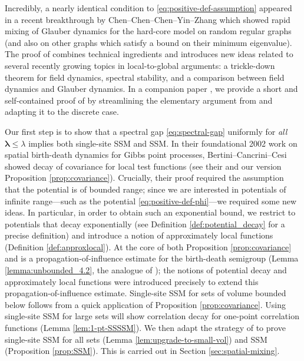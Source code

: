 \documentclass[10pt]{amsart}
\theoremstyle{definition}
\theoremstyle{remark}
\newcommand{\blambda}{{\boldsymbol{\lambda}}}
\begin{document}
	Incredibly, a nearly identical condition to \eqref{eq:positive-def-assumption} appeared in a recent breakthrough by Chen--Chen--Chen--Yin--Zhang \cite{chen2025rapid} which showed rapid mixing of Glauber dynamics for the hard-core model on random regular graphs (and also on other graphs which satisfy a bound on their minimum eigenvalue).  The proof of \cite{chen2025rapid} combines technical ingredients  and introduces new ideas related to several recently growing topics in local-to-global arguments: a trickle-down theorem for field dynamics, spectral stability, and a comparison between field dynamics and Glauber dynamics.  In a companion paper \cite{goebel2026simple}, we provide a short and self-contained proof of \cite{chen2025rapid} by streamlining the elementary argument from \cite{kondratiev2013spectral} and adapting it to the discrete case.
	
	Our first step is to show that a spectral gap \eqref{eq:spectral-gap} uniformly for \emph{all} $\blambda \leq \lambda$ implies both single-site SSM and SSM.  In their foundational 2002 work on spatial birth-death dynamics for Gibbs point processes, Bertini--Cancrini--Cesi showed decay of covariance for local test functions (see their \cite[Theorem 4.1]{bertini2002spectral} and our version Proposition \ref{prop:covariance}).  Crucially, their proof required the assumption that the potential is of bounded range; since we are interested in potentials of infinite range---such as the potential \eqref{eq:positive-def-phi}---we required some new ideas.  In particular, in order to obtain such an exponential bound, we restrict to potentials that decay exponentially (see Definition \ref{def:potential_decay} for a precise definition) and introduce a notion of approximately local functions (Definition \ref{def:approxlocal}).  At the core of both Proposition \ref{prop:covariance} and \cite[Theorem 4.1]{bertini2002spectral} is a propagation-of-influence estimate for the birth-death semigroup (Lemma \ref{lemma:unbounded_4.2}, the analogue of \cite[Lemma 4.2]{bertini2002spectral}); the notions of potential decay and approximately local functions were introduced precisely to extend this propagation-of-influence estimate.  Single-site SSM for sets of volume bounded below follows from a quick application of Proposition \ref{prop:covariance}.  Using single-site SSM for large sets will show correlation decay for one-point correlation functions (Lemma \ref{lem:1-pt-SSSSM}).  We then adapt the strategy of \cite{michelen2022strong} to prove single-site SSM for all sets (Lemma \ref{lem:upgrade-to-small-vol}) and SSM (Proposition \ref{prop:SSM}).   This is carried out in Section \ref{sec:spatial-mixing}.
	
\end{document}
